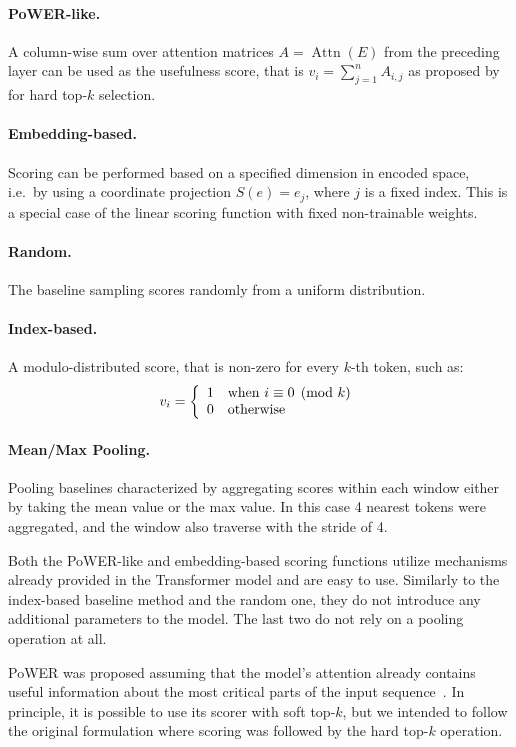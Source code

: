 \documentclass{article}
\begin{document}
\paragraph{PoWER-like.} 
A column-wise sum over attention matrices $A=\operatorname{Attn}(E)$ from the preceding layer can be used as the usefulness score, that is $v_{i} = \sum_{j=1}^{n} A_{i,j}$ as proposed by \citet{pmlr-v119-goyal20a} for hard top-$k$ selection.
\paragraph{Embedding-based.} 
Scoring can be performed based on a specified dimension in encoded space, i.e.\ by using a coordinate projection $S(e)=e_{j}$, where $j$ is a fixed index. This is a special case of the linear scoring function with fixed non-trainable weights.
\paragraph{Random.} The baseline sampling scores randomly from a uniform distribution.
\paragraph{Index-based.} A modulo-distributed score, that is non-zero for every $k$-th token, such as:
\[
v_i=\left\{
\begin{array}{l l}
1 & \mathrm{when}\ i \equiv 0 \pmod k \\
0 & \mathrm{otherwise} \\
\end{array}\right.
\]
\paragraph{Mean/Max Pooling.}
Pooling baselines characterized by aggregating scores within each window either by taking the mean value or the max value. In this case 4 nearest tokens were aggregated, and the window also traverse with the stride of 4.

Both the PoWER-like and embedding-based scoring functions utilize mechanisms already provided in the Transformer model and are easy to use. Similarly to the index-based baseline method and the random one, they do not introduce any additional parameters to the model. The last two do not rely on a pooling operation at all. 


PoWER was proposed assuming that the model's attention already contains useful information about the most critical parts of the input sequence~\citep{goyal2017continuous}. In principle, it is  possible to use its scorer with soft top-$k$, but we intended to follow the original formulation where scoring was followed by the hard top-$k$ operation. 
\end{document}
